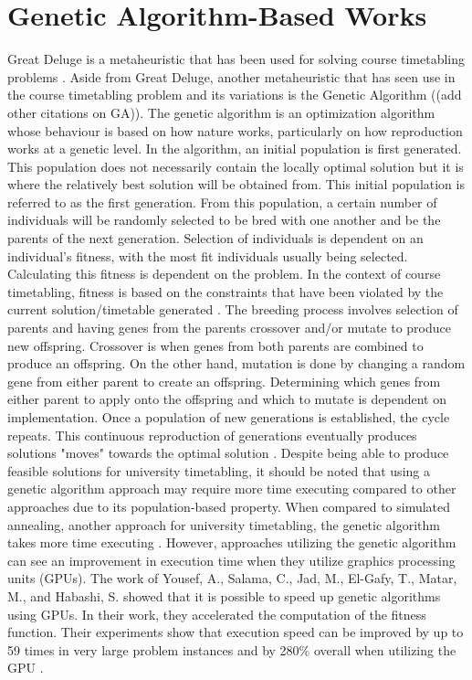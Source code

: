 \section{Genetic Algorithm-Based Works}
Great Deluge is a metaheuristic \cite{intro-gd-dueck} that has been used for solving course timetabling problems \cite{gd-burke}\cite{nlgd-landa-silva}\cite{nlgdrl-obit}. Aside from Great Deluge, another metaheuristic that has seen use in the course timetabling problem and its variations is the Genetic Algorithm ((add other citations on GA)). The genetic algorithm is an optimization algorithm whose behaviour is based on how nature works, particularly on how reproduction works at a genetic level. In the algorithm, an initial population is first generated. This population does not necessarily contain the locally optimal solution but it is where the relatively best solution will be obtained from. This initial population is referred to as the first generation. From this population, a certain number of individuals will be randomly selected to be bred with one another and be the parents of the next generation. Selection of individuals is dependent on an individual's fitness, with the most fit individuals usually being selected. Calculating this fitness is dependent on the problem. In the context of course timetabling, fitness is based on the constraints that have been violated by the current solution/timetable generated \cite{alves-novel-recursive}\cite{raghavjee-ga-south-africa}\cite{johan-ga-sa-comparison}\cite{yik-ga-timetabling}\cite{supachate-noval-approach-ga-thai}\cite{wutthipong-performance-study-genetic-operators}\cite{sanjay-an-application-of-ga}. The breeding process involves selection of parents and having genes from the parents crossover and/or mutate to produce new offspring. Crossover is when genes from both parents are combined to produce an offspring. On the other hand, mutation is done by changing a random gene from either parent to create an offspring. Determining which genes from either parent to apply onto the offspring and which to mutate is dependent on implementation. Once a population of new generations is established, the cycle repeats. This continuous reproduction of generations eventually produces solutions "moves" towards the optimal solution \cite{what-is-ga}. Despite being able to produce feasible solutions for university timetabling, it should be noted that using a genetic algorithm approach may require more time executing compared to other approaches due to its population-based property. When compared to simulated annealing, another approach for university timetabling, the genetic algorithm takes more time executing \cite{johan-ga-sa-comparison}. However, approaches utilizing the genetic algorithm can see an improvement in execution time when they utilize graphics processing units (GPUs). The work of Yousef, A., Salama, C., Jad, M., El-Gafy, T., Matar, M., and Habashi, S. showed that it is possible to speed up genetic algorithms using GPUs. In their work, they accelerated the computation of the fitness function. Their experiments show that execution speed can be improved by up to 59 times in very large problem instances and by 280\% overall when utilizing the GPU \cite{yousef-gpu-ga}.

